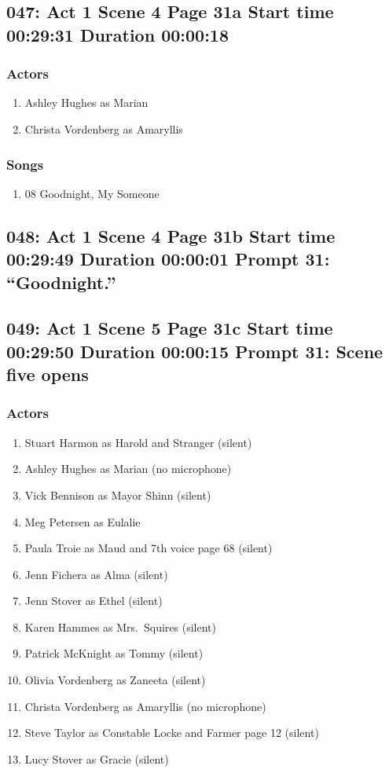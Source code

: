 \subsection{047: Act 1 Scene 4 Page 31a Start time 00:29:31 Duration 00:00:18}

\subsubsection{Actors}
\begin{enumerate}
\item Ashley Hughes as Marian
\item Christa Vordenberg as Amaryllis
\end{enumerate}

\subsubsection{Songs}
\begin{enumerate}
\item 08 Goodnight, My Someone
\end{enumerate}
\subsection{048: Act 1 Scene 4 Page 31b Start time 00:29:49 Duration 00:00:01 Prompt 31: ``Goodnight.''}

\subsection{049: Act 1 Scene 5 Page 31c Start time 00:29:50 Duration 00:00:15 Prompt 31: Scene five opens}

\subsubsection{Actors}
\begin{enumerate}
\item Stuart Harmon as Harold and Stranger (silent)
\item Ashley Hughes as Marian (no microphone)
\item Vick Bennison as Mayor Shinn (silent)
\item Meg Petersen as Eulalie
\item Paula Troie as Maud and 7th voice page 68 (silent)
\item Jenn Fichera as Alma (silent)
\item Jenn Stover as Ethel (silent)
\item Karen Hammes as Mrs.~Squires (silent)
\item Patrick McKnight as Tommy (silent)
\item Olivia Vordenberg as Zaneeta (silent)
\item Christa Vordenberg as Amaryllis (no microphone)
\item Steve Taylor as Constable Locke and Farmer page 12 (silent)
\item Lucy Stover as Gracie (silent)
\end{enumerate}
